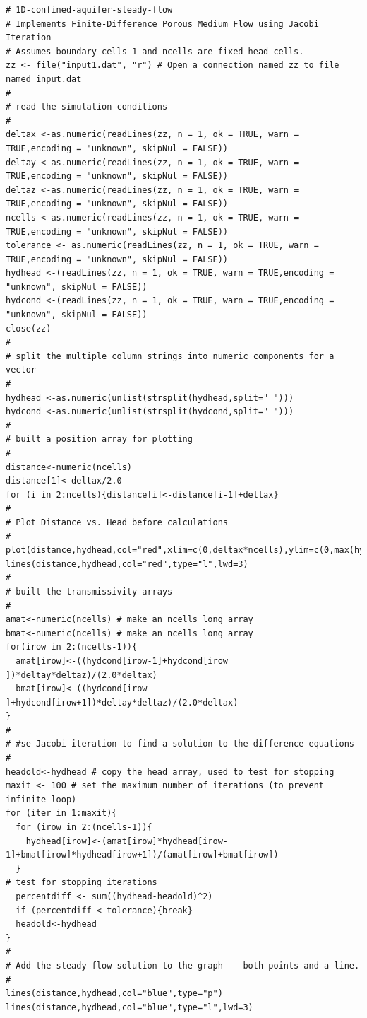 \begin{lstlisting}[caption=R code demonstrating an Aquifer Flow Simulator for Steady Flow \\ This fragment of code contains ..., label=lst:AquiferFlowSteady1Dimensional]
# 1D-confined-aquifer-steady-flow
# Implements Finite-Difference Porous Medium Flow using Jacobi Iteration
# Assumes boundary cells 1 and ncells are fixed head cells.
zz <- file("input1.dat", "r") # Open a connection named zz to file named input.dat
#
# read the simulation conditions
#
deltax <-as.numeric(readLines(zz, n = 1, ok = TRUE, warn = TRUE,encoding = "unknown", skipNul = FALSE))
deltay <-as.numeric(readLines(zz, n = 1, ok = TRUE, warn = TRUE,encoding = "unknown", skipNul = FALSE))
deltaz <-as.numeric(readLines(zz, n = 1, ok = TRUE, warn = TRUE,encoding = "unknown", skipNul = FALSE))
ncells <-as.numeric(readLines(zz, n = 1, ok = TRUE, warn = TRUE,encoding = "unknown", skipNul = FALSE))
tolerance <- as.numeric(readLines(zz, n = 1, ok = TRUE, warn = TRUE,encoding = "unknown", skipNul = FALSE))
hydhead <-(readLines(zz, n = 1, ok = TRUE, warn = TRUE,encoding = "unknown", skipNul = FALSE))
hydcond <-(readLines(zz, n = 1, ok = TRUE, warn = TRUE,encoding = "unknown", skipNul = FALSE))
close(zz)
#
# split the multiple column strings into numeric components for a vector
#
hydhead <-as.numeric(unlist(strsplit(hydhead,split=" ")))
hydcond <-as.numeric(unlist(strsplit(hydcond,split=" ")))
#
# built a position array for plotting
#
distance<-numeric(ncells)
distance[1]<-deltax/2.0
for (i in 2:ncells){distance[i]<-distance[i-1]+deltax}
#
# Plot Distance vs. Head before calculations
#
plot(distance,hydhead,col="red",xlim=c(0,deltax*ncells),ylim=c(0,max(hydhead)*2.0),pch=21,tck=1)
lines(distance,hydhead,col="red",type="l",lwd=3)
#
# built the transmissivity arrays
#
amat<-numeric(ncells) # make an ncells long array
bmat<-numeric(ncells) # make an ncells long array
for(irow in 2:(ncells-1)){
  amat[irow]<-((hydcond[irow-1]+hydcond[irow  ])*deltay*deltaz)/(2.0*deltax)
  bmat[irow]<-((hydcond[irow  ]+hydcond[irow+1])*deltay*deltaz)/(2.0*deltax)
}
#
# #se Jacobi iteration to find a solution to the difference equations
# 
headold<-hydhead # copy the head array, used to test for stopping 
maxit <- 100 # set the maximum number of iterations (to prevent infinite loop)
for (iter in 1:maxit){
  for (irow in 2:(ncells-1)){
    hydhead[irow]<-(amat[irow]*hydhead[irow-1]+bmat[irow]*hydhead[irow+1])/(amat[irow]+bmat[irow])
  }
# test for stopping iterations
  percentdiff <- sum((hydhead-headold)^2)
  if (percentdiff < tolerance){break}
  headold<-hydhead
}
#
# Add the steady-flow solution to the graph -- both points and a line.
#
lines(distance,hydhead,col="blue",type="p")
lines(distance,hydhead,col="blue",type="l",lwd=3)
\end{lstlisting}

